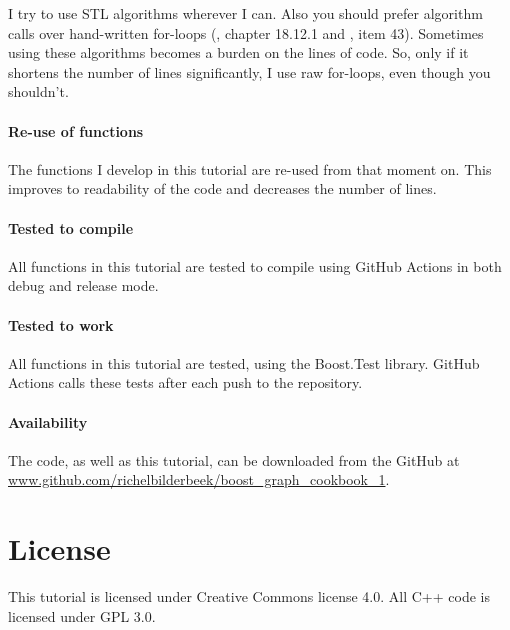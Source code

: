I try to use STL algorithms wherever I can.
Also you should prefer algorithm calls over hand-written 
for-loops (\cite{stroustrup1997}, chapter 18.12.1 
and \cite{meyers2005effective}, item 43).
Sometimes using these algorithms becomes a burden on the lines of code.
So, only if it shortens the number of lines significantly, I use raw for-loops,
even though you shouldn't.

\paragraph{Re-use of functions}

The functions I develop in this tutorial are re-used from that moment on.
This improves to readability of the code and decreases the number of lines.

\paragraph{Tested to compile}

All functions in this tutorial are tested to compile using GitHub Actions in
both debug and release mode.

\paragraph{Tested to work}

All functions in this tutorial are tested, using the Boost.Test library.
GitHub Actions calls these tests after each push to the repository.

\paragraph{Availability}

The code, as well as this tutorial, can be downloaded from the GitHub at
\url{www.github.com/richelbilderbeek/boost_graph_cookbook_1}.

\section{License}

This tutorial is licensed under Creative Commons license 4.0.
All C++ code is licensed under GPL 3.0.

